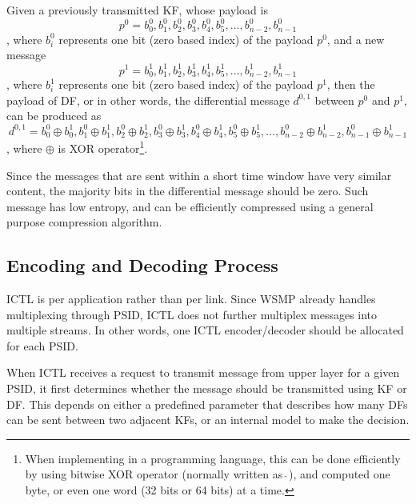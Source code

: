 \documentclass[12pt]{report}
\begin{document}
Given a previously transmitted KF, whose payload is
\begin{equation}
  p^0={b^0_0,b^0_1,b^0_2,b^0_3,b^0_4,b^0_5,\ldots,b^0_{n-2},b^0_{n-1}}
\end{equation}
, where $b^0_i$ represents one bit (zero based index) of the payload $p^0$, and a new message
\begin{equation}
  p^1={b^1_0,b^1_1,b^1_2,b^1_3,b^1_4,b^1_5,\ldots,b^1_{n-2},b^1_{n-1}}
\end{equation}
, where $b^1_i$ represents one bit (zero based index) of the payload $p^1$, then the payload of DF, or in other words, the differential message $d^{0,1}$ between $p^0$ and $p^1$, can be produced as
\begin{equation}
  d^{0,1}={b^0_0\oplus b^1_0,b^0_1\oplus b^1_1,b^0_2\oplus b^1_2,b^0_3\oplus b^1_3,b^0_4\oplus b^1_4,b^0_5\oplus b^1_5,\ldots,b^0_{n-2}\oplus b^1_{n-2},b^0_{n-1}\oplus b^1_{n-1}}
\end{equation}
, where $\oplus $ is XOR operator\footnote{When implementing in a programming language, this can be done efficiently by using bitwise XOR operator (normally written as $\hat{\ }$), and computed one byte, or even one word (32 bits or 64 bits) at a time.}.

Since the messages that are sent within a short time window have very similar content, the majority bits in the differential message should be zero. Such message has low entropy, and can be efficiently compressed using a general purpose compression algorithm.

\subsection{Encoding and Decoding Process}
\label{sec:ictl_process}

ICTL is per application rather than per link. Since WSMP already handles multiplexing through PSID, ICTL does not further multiplex messages into multiple streams. In other words, one ICTL encoder/decoder should be allocated for each PSID.

When ICTL receives a request to transmit message from upper layer for a given PSID, it first determines whether the message should be transmitted using KF or DF. This depends on either a predefined parameter that describes how many DFs can be sent between two adjacent KFs, or an internal model to make the decision.
\end{document}
